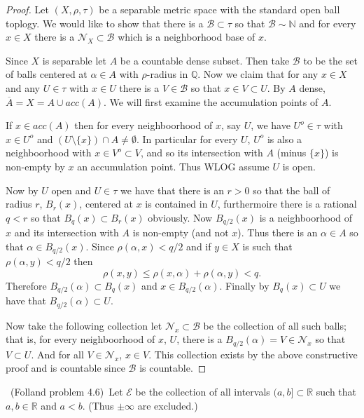 \documentclass[11pt]{amsart}
\theoremstyle{definition}
\numberwithin{theorem}{section}
\numberwithin{definition}{section}
\numberwithin{equation}{section}
\def\reals{{\mathbb R}}
\def\scriptb{{\mathcal B}}
\def\scripte{{\mathcal E}}
\def\scriptn{{\mathcal N}}
\begin{document}
\begin{proof}
	Let $(X, \rho, \tau)$ be a separable metric space with the standard open ball toplogy. We would like to show that there is a $\scriptb \subset \tau$ so that $\scriptb \sim \mathbb{N}$ and for every $x \in X$ there is a $\scriptn_X \subset \scriptb$ which is a neighborhood base of $x$.

	Since $X$ is separable let $A$ be a countable dense subset. Then take $\scriptb$ to be the set of balls centered at $\alpha \in A$ with $\rho$-radius in $\mathbb{Q}.$ Now we claim that for any $x \in X$ and any $U \in \tau$ with $x \in U$ there is a $V \in \scriptb$ so that $x \in V \subset U$. By $A$ dense, $\overline{A} = X = A \cup acc(A).$ We will first examine the accumulation points of $A$.

	If $x \in acc(A)$ then for every neighboorhood of $x$, say $U$, we have $U^o \in \tau$ with
	$x \in U^o$ and $ (U \setminus \{x\}) \cap A \neq \emptyset$. In particular for every $U$, $U^o$ is also a neighboorhood with $x \in V^o \subset V$, and so its intersection with $A$ (minus $\{x\}$) is non-empty by $x$ an accumulation point. Thus WLOG assume $U$ is open.

	Now by $U$ open and $U \in \tau$ we have that there is an $r >0$ so that the ball of radius $r$, $B_r(x)$, centered at $x$ is contained in $U$, furthermoire there is a rational $q < r$ so that $B_q(x) \subset B_r(x)$ obviously. Now $B_{q/2}(x)$ is a neighboorhood of $x$ and its intersection with $A$ is non-empty (and not $x$). Thus there is an $\alpha \in A$ so that $\alpha \in B_{q/2}(x)$. Since $\rho(\alpha, x) < q/2$ and if $y \in X$ is such that $\rho(\alpha, y) < q/2$ then $$\rho(x, y) \leq \rho(x, \alpha) + \rho(\alpha, y) < q.$$
	Therefore $B_{q/2}(\alpha) \subset B_{q}(x)$ and $x \in B_{q/2}(\alpha).$ Finally by $ B_{q}(x) \subset U$ we have that $B_{q/2}(\alpha) \subset U.$

	Now take the following collection let $\scriptn_x \subset \scriptb$ be the collection of all such balls; that is, for every neighboorhood of $x$, $U$, there is a $B_{q/2}(\alpha) = V  \in \scriptn_x$ so that $V \subset U$. And for all $V \in \scriptn_x$, $x \in V$. This collection exists by the above constructive proof and is countable since $\scriptb$ is countable. 
\end{proof}
\medskip {}\ (Folland problem 4.6)\ Let $\scripte$ be the collection of all intervals $(a,b] \subset \mathbb{R}$ such that $a,b \in \reals$ and $a <b$. (Thus $\pm \infty$ are excluded.) \\
\end{document}
